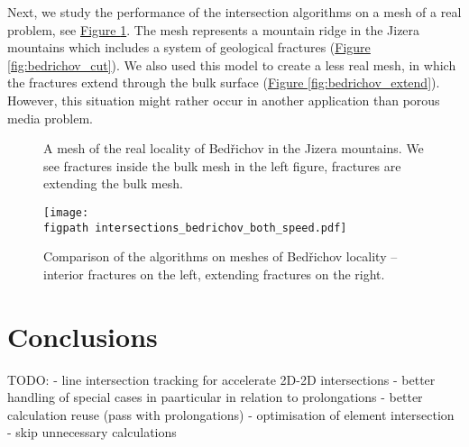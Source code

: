 \documentclass{elsarticle}
\newcommand{\fig}[1]{\hyperref[#1]{Figure \ref{#1}}}
\newcommand{\figpath}{figures/}
\begin{document}
Next, we study the performance of the intersection algorithms on a mesh of a real problem, see \fig{fig:bedrichov_meshes}. The mesh represents a mountain ridge in the Jizera mountains which 
includes a system of geological fractures (\fig{fig:bedrichov_cut}). We also used this model to create
a less real mesh, in which the fractures extend through the bulk surface (\fig{fig:bedrichov_extend}). 
However, this situation might rather occur in another application than porous media problem.

\begin{figure}[!htb]
    \hspace{3pt}
    \caption{A mesh of the real locality of Bed{\v r}ichov in the Jizera mountains.
             We see fractures inside the bulk mesh in the left figure,
             fractures are extending the bulk mesh.}
    \label{fig:bedrichov_meshes}
\end{figure}

\begin{figure}[!htb]
    \centering
    \texttt{[image: \\figpath intersections\_bedrichov\_both\_speed.pdf]}
    \caption{Comparison of the algorithms on meshes of Bed{\v r}ichov locality -- interior fractures on the left,
             extending fractures on the right.}
    \label{fig:bedrichov_speed}
\end{figure}





\section{Conclusions}
\label{sec:conclusins}

TODO:
- line intersection tracking for accelerate 2D-2D intersections
- better handling of special cases in paarticular in relation to prolongations
- better calculation reuse (pass with prolongations)
- optimisation of element intersection - skip unnecessary calculations
\end{document}
